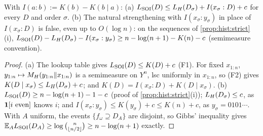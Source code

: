 \begin{proposition}\label{prop:hist:info}
With $I(a:b):=K(b)-K(b\mid a)$: (a) $L_{\mathrm{SOI}}(D)\le L_{H}(D_\sigma)+I(x_\sigma:D)+c$ for every $D$ and order $\sigma$. (b) The natural strengthening with $I(x_\sigma:y_\sigma)$ in place of $I(x_\sigma:D)$ is false, even up to $O(\log n)$: on the sequences of \cref{prop:hist:strict}(i), $L_{\mathrm{SOI}}(D)-L_{H}(D_\sigma)-I(x_\sigma:y_\sigma)\ge n-\log(n+1)-K(n)-c$ (semimeasure convention).
\end{proposition}

\begin{proof}
(a) The lookup table gives $L_{\mathrm{SOI}}(D)\le K(D)+c$ (F1). For fixed $x_{1:n}$, $y_{1:n}\mapsto M_{H}(y_{1:n}\Vert x_{1:n})$ is a semimeasure on $Y^n$, lsc uniformly in $x_{1:n}$, so (F2) gives $K(D\mid x_\sigma)\le L_{H}(D_\sigma)+c$; and $K(D)=I(x_\sigma:D)+K(D\mid x_\sigma)$. (b) $L_{\mathrm{SOI}}(D)\ge n-\log(n+1)-1-c$ (proof of \cref{prop:hist:strict}(i)); $L_{H}(D_\sigma)\le c$, as $\mathbf{1}[i\text{ even}]$ knows $i$; and $I(x_\sigma:y_\sigma)\le K(y_\sigma)+c\le K(n)+c$, as $y_\sigma=0101\cdots$. With $A$ uniform, the events $\{f_\omega\supseteq D_A\}$ are disjoint, so Gibbs' inequality gives $\mathbb{E}_AL_{\mathrm{SOI}}(D_A)\ge\log\binom n{\lfloor n/2\rfloor}\ge n-\log(n+1)$ exactly.
\end{proof}

